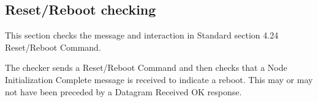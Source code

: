 \subsection{Reset/Reboot checking}

This section checks the message and interaction in Standard section 4.24 Reset/Reboot Command.

The checker sends a Reset/Reboot Command and then checks that a Node Initialization 
Complete message is received to indicate a reboot.  This may or may not have been
preceded by a Datagram Received OK response.

  
